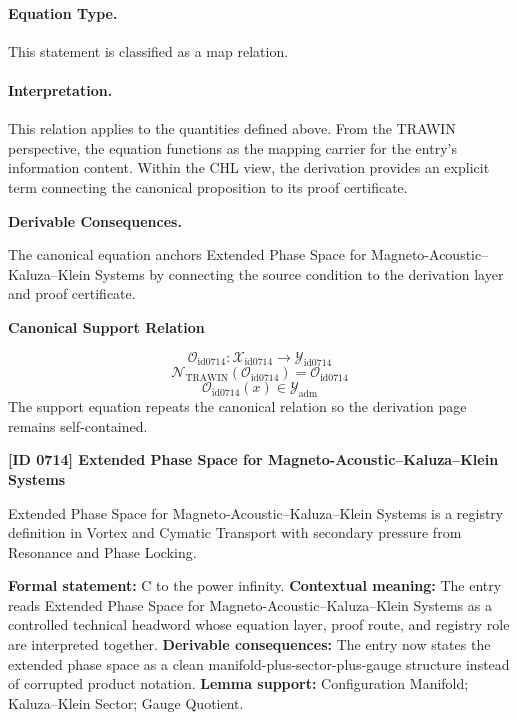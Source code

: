 \paragraph{Equation Type.}
This statement is classified as a map relation.

\paragraph{Interpretation.}
This relation applies to the quantities defined above. From the TRAWIN perspective, the equation functions as the mapping carrier for the entry’s information content. Within the CHL view, the derivation provides an explicit term connecting the canonical proposition to its proof certificate.

\par\vspace{0.35em}
\noindent\textbf{Derivable Consequences.}\quad
\begingroup
\footnotesize
\raggedright
The canonical equation anchors Extended Phase Space for Magneto-Acoustic--Kaluza--Klein Systems by connecting the source condition to the derivation layer and proof certificate.
\par\endgroup

\noindent\textbf{Canonical Support Relation}\par
\[
\mathcal{O}_{\mathrm{id0714}}:\mathcal{X}_{\mathrm{id0714}}\longrightarrow\mathcal{Y}_{\mathrm{id0714}}
\]
\[
\mathcal{N}_{\mathrm{TRAWIN}}(\mathcal{O}_{\mathrm{id0714}})=\mathcal{O}_{\mathrm{id0714}}
\]
\[
\mathcal{O}_{\mathrm{id0714}}(x)\in\mathcal{Y}_{\mathrm{adm}}
\]
\noindent The support equation repeats the canonical relation so the derivation page remains self-contained.\par

\clearpage
\noindent\textbf{[ID 0714] Extended Phase Space for Magneto-Acoustic--Kaluza--Klein Systems}\par
\vspace{0.35em}
\begingroup\small
{}
Extended Phase Space for Magneto-Acoustic--Kaluza--Klein Systems is a registry definition in Vortex and Cymatic Transport with secondary pressure from Resonance and Phase Locking.

\begingroup\footnotesize\setlength{\emergencystretch}{3em}\sloppy
\textbf{Formal statement:} C to the power infinity. \textbf{Contextual meaning:} The entry reads Extended Phase Space for Magneto-Acoustic--Kaluza--Klein Systems as a controlled technical headword whose equation layer, proof route, and registry role are interpreted together. \textbf{Derivable consequences:} The entry now states the extended phase space as a clean manifold-plus-sector-plus-gauge structure instead of corrupted product notation. \textbf{Lemma support:} Configuration Manifold; Kaluza--Klein Sector; Gauge Quotient.\par
\endgroup

